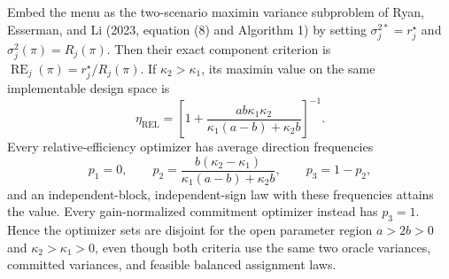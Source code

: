 Embed the menu as the two-scenario maximin variance subproblem of Ryan, Esserman, and Li (2023, equation (8) and Algorithm 1) by setting \(\sigma_j^{2*}=r_j^\star\) and \(\sigma_j^2(\pi)=R_j(\pi)\). Then their exact component criterion is \(\operatorname{RE}_j(\pi)=r_j^\star/R_j(\pi)\). If \(\kappa_2>\kappa_1\), its maximin value on the same implementable design space is \[\eta_{\mathrm{REL}}=\left[1+\frac{ab\kappa_1\kappa_2}{\kappa_1(a-b)+\kappa_2b}\right]^{-1}.\] Every relative-efficiency optimizer has average direction frequencies \[p_1=0,\qquad p_2=\frac{b(\kappa_2-\kappa_1)}{\kappa_1(a-b)+\kappa_2b},\qquad p_3=1-p_2,\] and an independent-block, independent-sign law with these frequencies attains the value. Every gain-normalized commitment optimizer instead has \(p_3=1\). Hence the optimizer sets are disjoint for the open parameter region \(a>2b>0\) and \(\kappa_2>\kappa_1>0\), even though both criteria use the same two oracle variances, committed variances, and feasible balanced assignment laws.